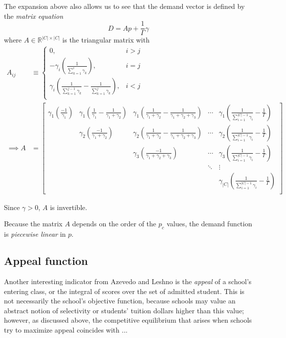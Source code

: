 \documentclass[12pt]{article}
\theoremstyle{definition}
\begin{document}
The expansion above also allows us to see that the demand vector is defined by the \emph{matrix equation}
\begin{equation}D = A p + \frac{1}{\Gamma}\gamma \label{demandmatrixeq}\end{equation}
where $A\in \mathbb{R}^{|C| \times |C|}$ is the triangular matrix with
\begin{align}A_{ij} &\equiv \begin{cases}
0, & i > j \\
-\gamma_i \left(\frac{1}{ \sum_{k=1}^i \gamma_k}\right), & i=j \\
\gamma_i \left( \frac{1}{\sum_{k=1}^{j-1} \gamma_k} -  \frac{1}{\sum_{k=1}^{j} \gamma_k}\right), & i<j \\
\end{cases} \label{Adef} \\[.8em]
\implies A &= \begin{bmatrix}
\gamma_1 \left( \frac{-1}{\gamma_1} \right) & \gamma_1 \left(\frac{1}{\gamma_1} - \frac{1}{\gamma_1 + \gamma_2} \right) & \gamma_1 \left(\frac{1}{\gamma_1 + \gamma_2} - \frac{1}{\gamma_1 + \gamma_2 + \gamma_3} \right) & \cdots &  \gamma_1 \left(\frac{1}{\sum_{i=1}^{|C| - 1}\gamma_i} - \frac{1}{\Gamma}  \right)  \\
 & \gamma_2 \left( \frac{-1}{\gamma_1 + \gamma_2} \right) & \gamma_2 \left(\frac{1}{\gamma_1 + \gamma_2} - \frac{1}{\gamma_1 + \gamma_2 + \gamma_3} \right) & \cdots &  \gamma_2 \left(\frac{1}{\sum_{i=1}^{|C| - 1}\gamma_i} - \frac{1}{\Gamma} \right)  \\
 &  & \gamma_3 \left( \frac{-1}{\gamma_1 + \gamma_2 + \gamma_3} \right) & \cdots &  \gamma_3 \left(\frac{1}{\sum_{i=1}^{|C| - 1}\gamma_i} - \frac{1}{\Gamma} \right)  \\
 & & & \ddots & \vdots \\
 &  &  &  &  \gamma_{|C|} \left(\frac{1}{\sum_{i=1}^{|C| - 1}\gamma_i} -\frac{1}{\Gamma}  \right)  \\
\end{bmatrix}\end{align}

Since $\gamma > 0$, $A$ is invertible. 

Because the matrix $A$ depends on the order of the $p_c$ values, the demand function is \emph{piecewise linear} in $p$.

\subsection{Appeal function}
Another interesting indicator from Azevedo and Leshno \parencite*{supplydemandfw} is the \emph{appeal} of a school's entering class, or the integral of scores over the set of admitted student. This is not necessarily the school's objective function, because schools may value an abstract notion of selectivity or students' tuition dollars higher than this value; however, as discussed above, the competitive equilibrium that arises when schools try to maximize appeal coincides with ...
\end{document}
